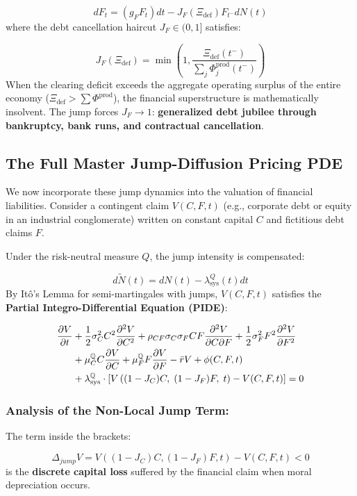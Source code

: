 \documentclass[11pt,letterpaper]{report}
\newcommand{\fitmath}[1]{\begingroup\setbox0=\hbox{$\displaystyle #1$}\ifdim\wd0>\linewidth\resizebox{\linewidth}{!}{$\displaystyle #1$}\else\displaystyle #1\fi\endgroup}
\begin{document}
\[
d{F}_{t}=\left({{g}_{F}{F}_{t}}\right)dt-{J}_{F}({\Xi }_{\mathrm{def}}){F}_{{t}^{-}}dN(t)
\]
where the debt cancellation haircut ${J}_{F}\in (0,1]$ satisfies:

\[
{J}_{F}({\Xi }_{\mathrm{def}})=\min\left({1,\frac{{\Xi }_{\mathrm{def}}({t}^{-})}{\sum_{j}{\Phi }_{j}^{\mathrm{prod}}({t}^{-})}}\right)
\]
When the clearing deficit exceeds the aggregate operating surplus of the entire economy (${\Xi }_{\mathrm{def}}>\sum{\Phi }^{\mathrm{prod}}$), the financial superstructure is mathematically insolvent. The jump forces ${J}_{F}\rightarrow 1$: \textbf{generalized debt jubilee through bankruptcy, bank runs, and contractual cancellation}.

\subsection{The Full Master Jump-Diffusion Pricing PDE}
We now incorporate these jump dynamics into the valuation of financial liabilities. Consider a contingent claim $V(C,F,t)$ (e.g., corporate debt or equity in an industrial conglomerate) written on constant capital $C$ and fictitious debt claims $F$.

Under the risk-neutral measure $Q$, the jump intensity is compensated:

\[
d\tilde{N}(t)=dN(t)-{\lambda }_{\mathrm{sys}}^{Q}(t)dt
\]
By Itô's Lemma for semi-martingales with jumps, $V(C,F,t)$ satisfies the \textbf{Partial Integro-Differential Equation (PIDE)}:

\[\fitmath{\begin{aligned} \frac{\partial V}{\partial t} &+ \frac{1}{2} \sigma_C^2 C^2 \frac{\partial^2 V}{\partial C^2} + \rho_{CF} \sigma_C \sigma_F C F \frac{\partial^2 V}{\partial C \partial F} + \frac{1}{2} \sigma_F^2 F^2 \frac{\partial^2 V}{\partial F^2} \\ &+ \mu_C^\mathbb{Q} C \frac{\partial V}{\partial C} + \mu_F^\mathbb{Q} F \frac{\partial V}{\partial F} - \bar{r} V + \phi(C, F, t) \\ &+ \lambda_{\text{sys}}^\mathbb{Q} \cdot \left[ V\left( (1 - J_C)C, \; (1 - J_F)F, \; t \right) - V(C, F, t) \right] = 0 \end{aligned}}\]
\subsubsection{Analysis of the Non-Local Jump Term:}
The term inside the brackets:

\[
{\Delta }_{jump}V=V\left({(1-{J}_{C})C,(1-{J}_{F})F,t}\right)-V(C,F,t)<0
\]
is the \textbf{discrete capital loss} suffered by the financial claim when moral depreciation occurs.
\end{document}
